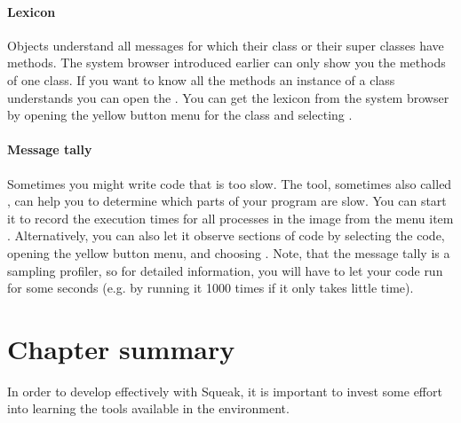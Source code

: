 \documentclass[a4paper,10pt,twoside]{book}
\begin{document}
\paragraph{Lexicon}
Objects understand all messages for which their class or their super classes have methods.
The system browser introduced earlier can only show you the methods of one class.
If you want to know all the methods an instance of a class understands you can open the .
You can get the lexicon from the system browser by opening the yellow button menu for the class and selecting .

\paragraph{Message tally}
Sometimes you might write code that is too slow.
The  tool, sometimes also called , can help you to determine which parts of your program are slow.
You can start it to record the execution times for all processes in the image from the menu item .
Alternatively, you can also let it observe sections of code by selecting the code, opening the yellow button menu, and choosing .
Note, that the message tally is a sampling profiler, so for detailed information, you will have to let your code run for some seconds (e.g. by running it 1000 times if it only takes little time).

\section{Chapter summary}

In order to develop effectively with Squeak, it is important to invest some effort into learning the tools available in the environment.
\end{document}
